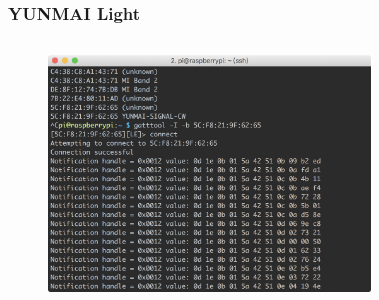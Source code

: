 \documentclass[UTF8]{ctexbeamer}
\begin{document}
\begin{frame}
  \frametitle{YUNMAI Light}
  \begin{columns}
  \begin{figure}
    \includegraphics[width=0.9\linewidth]{haoqing-term.png}
  \end{figure}
  \begin{figure}
    \centering
    \setlength{\fboxrule}{0.001cm}    %
    \setlength{\fboxsep}{0}
  \end{figure}
  \end{columns}
\end{frame}
\end{document}
